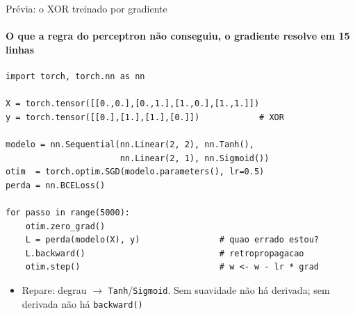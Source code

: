 \documentclass[aspectratio=169, 11pt]{beamer}
\begin{document}
\begin{frame}[fragile]{Prévia: o XOR treinado por gradiente}
  \framesubtitle{O que a regra do perceptron não conseguiu, o gradiente resolve em 15 linhas}

\begin{lstlisting}
import torch, torch.nn as nn

X = torch.tensor([[0.,0.],[0.,1.],[1.,0.],[1.,1.]])
y = torch.tensor([[0.],[1.],[1.],[0.]])            # XOR

modelo = nn.Sequential(nn.Linear(2, 2), nn.Tanh(),
                       nn.Linear(2, 1), nn.Sigmoid())
otim  = torch.optim.SGD(modelo.parameters(), lr=0.5)
perda = nn.BCELoss()

for passo in range(5000):
    otim.zero_grad()
    L = perda(modelo(X), y)                # quao errado estou?
    L.backward()                           # retropropagacao
    otim.step()                            # w <- w - lr * grad
\end{lstlisting}

  \vspace{-0.4em}
  \begin{itemize}
    \item Repare: degrau $\to$ \texttt{Tanh}/\texttt{Sigmoid}. Sem
          suavidade não há derivada; sem derivada não há \texttt{backward()}
  \end{itemize}
\end{frame}
\end{document}
